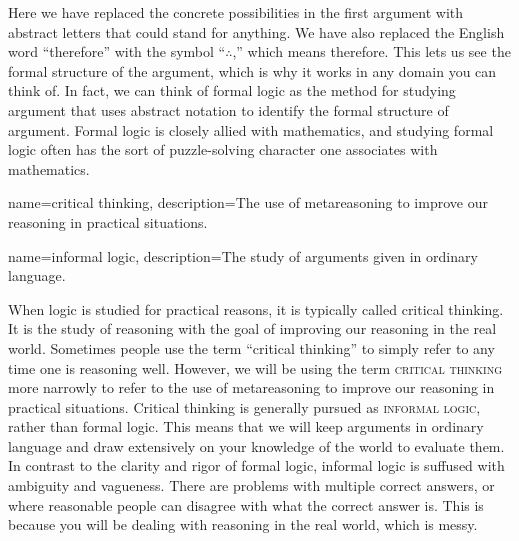 Here we have replaced the concrete possibilities in the first argument with abstract letters that could stand for anything. We have also replaced the English word ``therefore'' with the symbol ``$\therefore$,'' which means therefore. This lets us see the formal structure of the argument, which is why it works in any domain you can think of. In fact, we can think of formal logic as the method for studying argument that uses abstract notation to identify the formal structure of argument.  Formal logic is closely allied with mathematics, and studying formal logic often has the sort of puzzle-solving character one associates with mathematics. 
	{
	{
{}	
	{}	}}
 
{
name=critical thinking,
description={The use of metareasoning to improve our reasoning in practical situations.}
}

{
name=informal logic,
description={The study of arguments given in ordinary language.}
}


When logic is studied for practical reasons, it is typically called critical thinking. It is the study of reasoning with the goal of improving our reasoning in the real world. Sometimes people use the term ``critical thinking'' to simply refer to any time one is reasoning well. However, we will be using the term \textsc{\gls{critical thinking}} more narrowly to refer to the use of metareasoning to improve our reasoning in practical situations.  \label{def:Critical_Thinking} Critical thinking is generally pursued as \textsc{\gls{informal logic}}, rather than formal logic. This means that we will keep arguments in ordinary language and draw extensively on your knowledge of the world to evaluate them. In contrast to the clarity and rigor of formal logic, informal logic is suffused with ambiguity and vagueness. There are problems  with multiple correct answers, or where reasonable people can disagree with what the correct answer is. This is because you will be dealing with reasoning in the real world, which is messy. \label{messiness_warning} 
\label{ver_var} 
  

